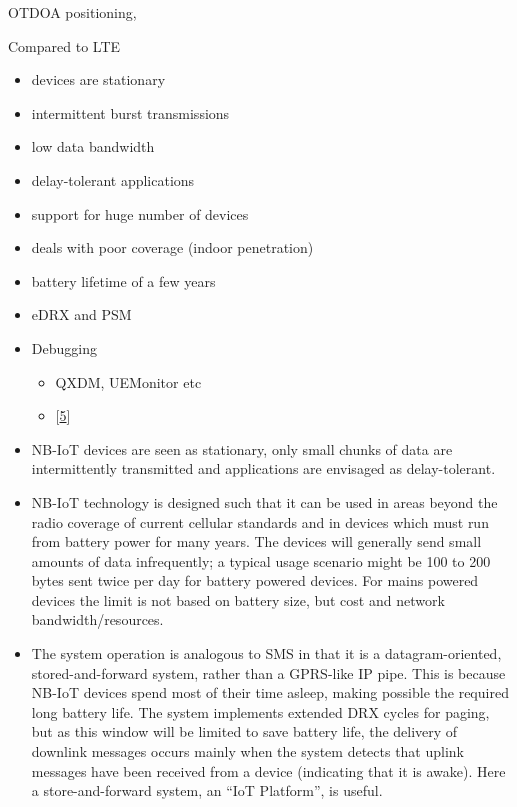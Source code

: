 \documentclass[]{article}
\providecommand{\tightlist}{%
  \setlength{\itemsep}{0pt}\setlength{\parskip}{0pt}}
\begin{document}
OTDOA positioning,

Compared to LTE

\begin{itemize}
\item
  devices are stationary
\item
  intermittent burst transmissions
\item
  low data bandwidth
\item
  delay-tolerant applications
\item
  support for huge number of devices
\item
  deals with poor coverage (indoor penetration)
\item
  battery lifetime of a few years
\item
  eDRX and PSM
\item
  Debugging

  \begin{itemize}
  \tightlist
  \item
    QXDM, UEMonitor etc
  \item
    {[}\protect\hyperlink{ref-ubloxAppNote2018}{5}{]}
  \end{itemize}
\item
  NB-IoT devices are seen as stationary, only small chunks of data are
  intermittently transmitted and applications are envisaged as
  delay-tolerant.
\item
  NB-IoT technology is designed such that it can be used in areas beyond
  the radio coverage of current cellular standards and in devices which
  must run from battery power for many years. The devices will generally
  send small amounts of data infrequently; a typical usage scenario
  might be 100 to 200 bytes sent twice per day for battery powered
  devices. For mains powered devices the limit is not based on battery
  size, but cost and network bandwidth/resources.
\item
  The system operation is analogous to SMS in that it is a
  datagram-oriented, stored-and-forward system, rather than a GPRS-like
  IP pipe. This is because NB-IoT devices spend most of their time
  asleep, making possible the required long battery life. The system
  implements extended DRX cycles for paging, but as this window will be
  limited to save battery life, the delivery of downlink messages occurs
  mainly when the system detects that uplink messages have been received
  from a device (indicating that it is awake). Here a store-and-forward
  system, an ``IoT Platform'', is useful.
\end{itemize}
\end{document}
